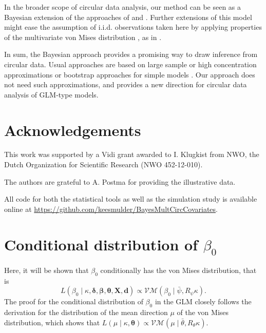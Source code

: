 \documentclass[11pt,a4paper]{article}\usepackage[]{graphicx}\usepackage[]{color}
\newcommand{\bX}{\boldsymbol{X}}
\newcommand{\bt}{\boldsymbol{\theta}}
\newcommand{\bd}{\boldsymbol{d}}
\newcommand{\bdt}{\boldsymbol{\delta}}
\newcommand{\bbt}{\boldsymbol{\beta}}
\begin{document}
In the broader scope of circular data analysis, our method can be seen as a Bayesian extension of the approaches of \citet{artes2008hypothesis} and \citet{lagona2015regression}. Further extensions of this model might ease the assumption of i.i.d. observations taken here by applying properties of the multivariate von Mises distribution \citep{mardia2008multivariate, mardia2014some}, as in \citet{lagona2015regression}.

In sum, the Bayesian approach provides a promising way to draw inference from circular data. Usual approaches are based on large sample or high concentration approximations \citep{artes2008hypothesis} or bootstrap approaches for simple models \citep{baayen2012test, baayen2014evaluating}. Our approach does not need such approximations, and provides a new direction for circular data analysis of GLM-type models.

\section{Acknowledgements}

This work was supported by a Vidi grant awarded to I. Klugkist from NWO, the Dutch Organization for Scientific Research (NWO 452-12-010).

The authors are grateful to A. Postma for providing the illustrative data.

All code for both the statistical tools as well as the simulation study is available online at \url{https://github.com/keesmulder/BayesMultCircCovariates}.




\newpage

\appendix

\section{Conditional distribution of $\beta_0$} \label{beta0}

Here, it will be shown that $\beta_0$ conditionally has the von Mises distribution, that is
\begin{equation}
L(\beta_0 \mid \kappa, \bdt, \bbt, \bt, \bX, \bd)  \propto \mathcal{VM}(\beta_0 \mid \bar\psi, R_{\psi}\kappa).
\end{equation} %
The proof for the conditional distribution of $\beta_0$ in the GLM closely follows the derivation for the distribution of the mean direction $\mu$ of the von Mises distribution, which shows that $L(\mu \mid \kappa, \boldsymbol\theta) \propto \mathcal{VM}(\mu \mid \bar\theta, R_{\theta} \kappa)$.
\end{document}
